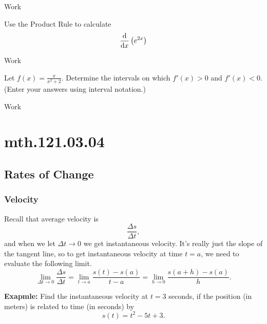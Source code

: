 \documentclass[12pt,addpoints, answers, fleqn]{exam}
\begin{document}
\begin{teacher}
\begin{questions}
\begin{solution}
Work
\end{solution}

\question 	%

Use the Product Rule to calculate 
\[
\frac{{\rm{d}}}{{\rm{d}}x} \left( e^{2x} \right)
\]
 
 \begin{solution}
Work
\end{solution}


\question 	%

Let $f\left(x\right) = \displaystyle \frac{x}{x^2 + 2}$. Determine the intervals on which $f'\left(x\right) > 0$ and $f'\left(x\right) < 0$. (Enter your answers using interval notation.)

\begin{solution}
Work
\end{solution}
\end{questions}
\end{teacher}
\vfill
\pagebreak

\section{mth.121.03.04}
\subsection{Rates of Change}

\subsubsection{Velocity}

Recall that average velocity is
\[
\frac{\Delta s}{\Delta t},
\]
and when we let $\Delta t \to 0$ we get instantaneous velocity. It's really just the slope of the tangent line, so to get instantaneous velocity at time $t=a$, we need to evaluate the following limit.
\[
\mathop {\lim }\limits_{\Delta t \to 0 } \frac{\Delta s}{\Delta t} = \mathop {\lim }\limits_{t \to a } \frac{s\left(t\right) - s\left(a\right)}{t-a} =
\mathop {\lim }\limits_{h \to 0 } \frac{s\left(a + h\right) - s\left(a\right)}{h}.
\]



\textbf{Exapmle:} Find the instantaneous velocity at $t=3$ seconds, if the position (in meters) is related to time (in seconds) by
\[
s \left( t \right) = t^2-5t+3.
\]
\end{document}
